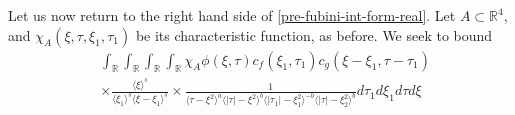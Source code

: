 \documentclass[12pt,reqno]{amsart}
\numberwithin{equation}{section}  %
\numberwithin{figure}{section}
\newcommand{\rr}{\mathbb{R}}
\newcommand{\zz}{\mathbb{Z}}
\theoremstyle{plain}
\theoremstyle{definition}
\theoremstyle{remark}
\begin{document}
%
%
%
%
Let us now return to the right hand side of \eqref{pre-fubini-int-form-real}.
Let $A \subset \rr^{4}$, and $\chi_{A}(\xi, \tau, \xi_{1}, \tau_{1})$ be its
characteristic function, as before.  We seek to bound
\begin{equation*}
\begin{split}
  & \int_{\rr} \int_{\rr}     \int_{\rr}  \int_{\rr} \chi_{A} \phi(\xi, \tau)
    c_f(\xi_1, \tau_1)
		c_g(\xi - \xi_1, \tau - \tau_1 )
		\\
    & \times \frac{\langle \xi \rangle ^{s}}{\langle \xi_{1} \rangle ^{s} \langle
    \xi-\xi_{1} \rangle ^{s}} \times \frac{1}{ \langle \tau - \xi^{2} \rangle^{a}
\langle |\tau| - \xi^{2} \rangle
    ^{b}\langle |\tau_{1}|-\xi_{1}^{2} \rangle ^{-b}\langle | \tau|-\xi_{2}^{2}
    \rangle ^{b}} d \tau_1 d \xi_{1} d \tau d \xi
\end{split}
\end{equation*}
\end{document}

